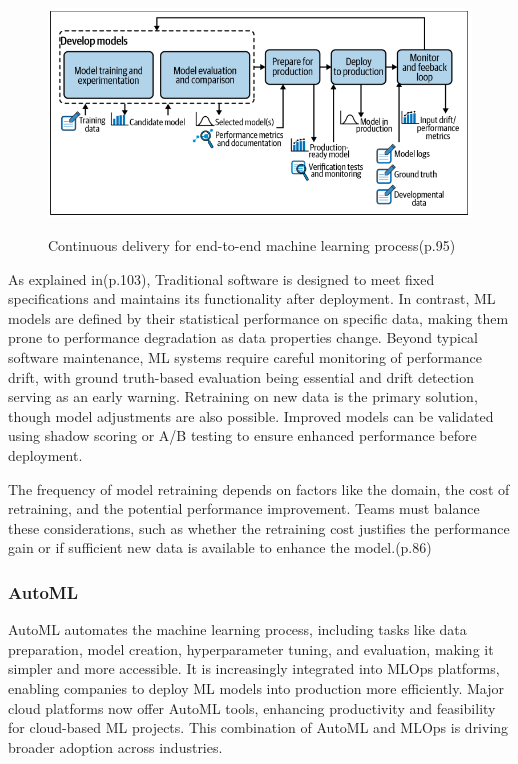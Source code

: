 \begin{figure}[!htbp]
    \caption{Continuous delivery for end-to-end machine learning process\cite{treveil2020introducing}(p.95)}
    \centering
    \includegraphics[scale=0.4]{images/feedback-loop-intro}
    \label{fig:feedback-loop-intro}
\end{figure}


As explained in\cite{treveil2020introducing}(p.103), Traditional software is designed to meet fixed specifications and maintains its functionality after deployment.
In contrast, ML models are defined by their statistical performance on specific data, making them prone to performance degradation as data properties change.
Beyond typical software maintenance, ML systems require careful monitoring of performance drift,
with ground truth-based evaluation being essential and drift detection serving as an early warning.
Retraining on new data is the primary solution, though model adjustments are also possible.
Improved models can be validated using shadow scoring or A/B testing to ensure enhanced performance before deployment.

The frequency of model retraining depends on factors like the domain, the cost of retraining, and the potential performance improvement.
Teams must balance these considerations, such as whether the retraining cost justifies the performance gain or if sufficient new data is available to enhance the model.\cite{treveil2020introducing}(p.86)

\subsubsection{AutoML}

AutoML automates the machine learning process, including tasks like data preparation, model creation, hyperparameter tuning, and evaluation,
making it simpler and more accessible.
It is increasingly integrated into MLOps platforms, enabling companies to deploy ML models into production more efficiently.
Major cloud platforms now offer AutoML tools, enhancing productivity and feasibility for cloud-based ML projects.
This combination of AutoML and MLOps is driving broader adoption across industries.\cite{gift2021practical,mlops-definition-tools-and-challenge}


